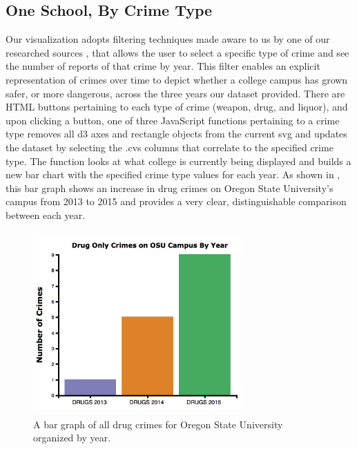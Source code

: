 \documentclass[journal]{vgtc}                %
\begin{document}
\subsection{One School, By Crime Type}
Our visualization adopts filtering techniques made aware to us by one of our researched sources \cite{ kogan_2013 }, that allows the user to select a specific type of crime and see the number of reports of that crime by year.  This filter enables an explicit representation of crimes over time to depict whether a college campus has grown safer, or more dangerous, across the three years our dataset provided. There are HTML buttons pertaining to each type of crime (weapon, drug, and liquor), and upon clicking a button, one of three JavaScript functions pertaining to a crime type removes all d3 axes and rectangle objects from the current svg and updates the dataset by selecting the .cvs columns that correlate to the specified crime type. The function looks at what college is currently being displayed and builds a new bar chart with the specified crime type values for each year. As shown in , this bar graph shows an increase in drug crimes on Oregon State University's campus from 2013 to 2015 and provides a very clear, distinguishable comparison between each year.
\begin{figure}[H]
\label{fig:OneSchoolOneType} 
\includegraphics[width=8cm, height=7cm]{OneSchoolOneType}
\caption{A bar graph of all drug crimes for Oregon State University organized by year.}
\end{figure}
\end{document}
